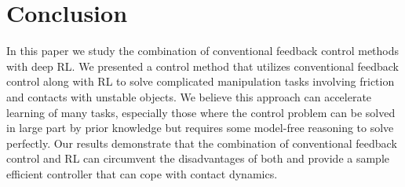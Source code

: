 \section{Conclusion}\label{sec:discussion}

In this paper we study the combination of conventional feedback control methods with deep RL. 
We presented a control method that utilizes conventional feedback control along with RL to solve complicated manipulation tasks involving friction and contacts with unstable objects. 
We believe this approach can accelerate learning of many tasks, especially those where the control problem can be solved in large part by prior knowledge but requires some model-free reasoning to solve perfectly.
Our results demonstrate that the combination of conventional feedback control and RL can circumvent the disadvantages of both and provide a sample efficient controller that can cope with contact dynamics.




